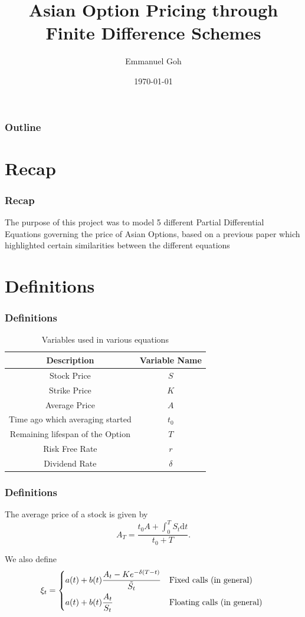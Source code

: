 \documentclass{beamer}
\title{Asian Option Pricing through Finite Difference Schemes}
\author{Emmanuel Goh}
\date{\today}
\begin{document}
  \begin{frame}
    \titlepage
  \end{frame}

  \begin{frame}
    \frametitle{Outline}
    \tableofcontents
  \end{frame}

  \section{Recap}
  \begin{frame}
    \frametitle{Recap}
    The purpose of this project was to model 5 different Partial Differential Equations governing the price of Asian Options, based on a previous paper which highlighted certain similarities between the different equations
  \end{frame}

  \section{Definitions}
  \begin{frame}
    \frametitle{Definitions}
    \begin{table}[h]
    \begin{tabular}{|c|c|}
      \hline
      \textbf{Description} & \textbf{Variable Name} \\ \hline
      Stock Price & \(S\) \\
      Strike Price & \(K\)\\
      Average Price & \(A\) \\
      Time ago which averaging started & \(t_0\) \\
      Remaining lifespan of the Option & \(T\) \\
      Risk Free Rate & \(r\) \\
      Dividend Rate & \(\delta\) \\
      \hline
    \end{tabular}
    \caption{Variables used in various equations}
    \label{table:name}
    \end{table}
  \end{frame}

  \begin{frame}
    \frametitle{Definitions}
    The average price of a stock is given by
    \begin{equation}
      A_T = \frac{t_0A + \int_0^T S_t \mathrm{d}t}{t_0 + T}.
    \end{equation}

    We also define
    \begin{equation}
      \xi_t =
      \begin{dcases*}
        a(t) + b(t) \frac{A_t - Ke^{-\delta(T-t)}}{\tilde{S_t}} & Fixed calls (in general) \\
        a(t) + b(t) \frac{A_t}{S_t} & Floating calls (in general)
      \end{dcases*}
    \end{equation}
  \end{frame}
\end{document}
